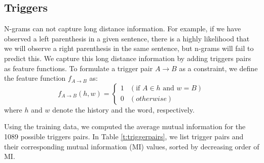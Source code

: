 \documentclass[11pt]{article}
\begin{document}
\subsection{Triggers}
\label{sec:trigger}
N-grams can not capture long distance information.
For example, if we have observed a left parenthesis in a given sentence,
there is a highly likelihood that we will observe a right parenthesis in the same sentence,
but n-grams will fail to predict this.
We capture this long distance information by adding triggers pairs as feature functions.
To formulate a trigger pair $A \rightarrow B$ as a constraint, we define the feature function $f_{A \rightarrow B}$ as:
\[
  f_{A \rightarrow B}(h, w) = \begin{cases}
    1 & (\textrm{if } A \in h \textrm{ and } w = B) \\
    0 & (otherwise)
  \end{cases}
\]
where $h$ and $w$ denote the history and the word, respectively.

Using the training data, we computed the average mutual information for the 1089 possible triggers pairs.
In Table \ref{t:triggerpairs}, we list trigger pairs and their corresponding mutual information (MI) values, sorted by decreasing order of MI.
\end{document}
